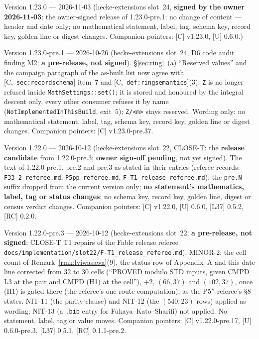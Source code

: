 \documentclass[11pt]{article}
\theoremstyle{remark}
\newcommand{\HA}[1]{[C,~\texttt{#1}]}      %
\begin{document}
Version 1.23.0 --- 2026-11-03 (hecke-extensions slot~24, \textbf{signed by the owner 2026-11-03}: the owner-signed release of 1.23.0-pre.1; no change of content --- header and date only; no mathematical statement, label, tag, schema key, record key, golden line or digest changes. Companion pointers: [C] v1.23.0, [U] 0.6.0.)

Version 1.23.0-pre.1 --- 2026-10-26 (hecke-extensions slot~24, D6 code audit finding M2; \textbf{a pre-release, not signed}). \S\ref{sec:ring}~(a) ``Reserved values'' and the campaign paragraph of the as-built list now agree with \HA{sec:recordschema} item~7 and \HA{def:ringsemantics}(3): \texttt{Z} is no longer refused inside \texttt{MathSettings::set()}; it is stored and honoured by the integral descent only, every other consumer refuses it by name (\texttt{NotImplementedInThisBuild}, exit~$5$); \texttt{Z/<m>} stays reserved. Wording only: no mathematical statement, label, tag, schema key, record key, golden line or digest changes. Companion pointers: [C] v1.23.0-pre.37.

Version 1.22.0 --- 2026-10-12 (hecke-extensions slot~22, CLOSE-T: the \textbf{release candidate} from 1.22.0-pre.3; \textbf{owner sign-off pending}, not yet signed). The text of 1.22.0-pre.1, pre.2 and pre.3 as stated in their entries (referee records: \texttt{F33-2\_referee.md}, \texttt{P5pp\_referee.md}, \texttt{F-T1\_release\_referee.md}); the \texttt{pre.N} suffix dropped from the current version only; \textbf{no statement's mathematics, label, tag or status changes}; no schema key, record key, golden line, digest or census verdict changes. Companion pointers: [C] v1.22.0, [U] 0.6.0, [L37] 0.5.2, [RC] 0.2.0.

Version 1.22.0-pre.3 --- 2026-10-12 (hecke-extensions slot~22; \textbf{a pre-release, not signed}; CLOSE-T T1 repairs of the Fable release referee \texttt{docs/implementation/slot22/F-T1\_release\_referee.md}). MINOR-2: the cell count of Remark~\ref{rmk:lviwasawa}(9), the status row of Appendix~A and this date line corrected from $32$ to $30$ cells (``PROVED modulo STD inputs, given CMPD L3 at the pair and CMPD (H1) at the cell''), $+2$, $(66,37)$ and $(102,37)$, once (H1) is gated there (the referee's one-route computation), as the P5$''$ referee's \S8 states. NIT-11 (the parity clause) and NIT-12 (the $(540,23)$ rows) applied as wording; NIT-13 (a \texttt{.bib} entry for Fukaya--Kato--Sharifi) not applied. No statement, label, tag or value moves. Companion pointers: [C] v1.22.0-pre.17, [U] 0.6.0-pre.3, [L37] 0.5.1, [RC] 0.1.1-pre.2.
\end{document}
